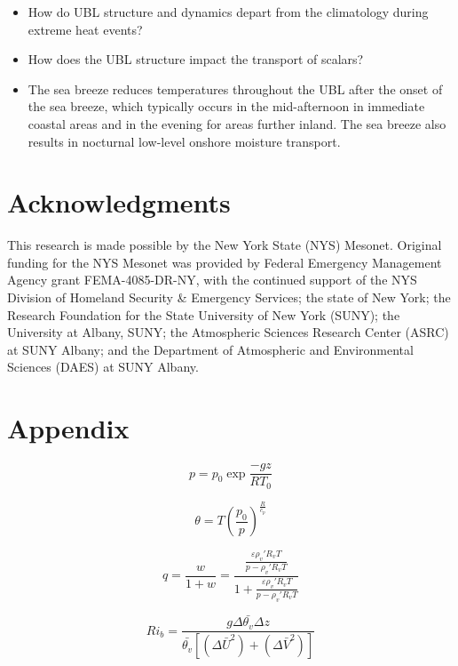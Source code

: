 \documentclass[11pt,a4paper]{article}
\begin{document}
\begin{itemize}
	\item How do UBL structure and dynamics depart from the climatology during extreme heat events?	
	\item How does the UBL structure impact the transport of scalars?
	\item The sea breeze reduces temperatures throughout the UBL after the onset of the sea breeze, which typically occurs in the mid-afternoon in immediate coastal areas and in the evening for areas further inland. The sea breeze also results in nocturnal low-level onshore moisture transport.
\end{itemize}

\section*{Acknowledgments}
This research is made possible by the New York State (NYS) Mesonet. Original funding for the NYS Mesonet was provided by Federal Emergency Management Agency grant FEMA-4085-DR-NY, with the continued support of the NYS Division of Homeland Security \& Emergency Services; the state of New York; the Research Foundation for the State University of New York (SUNY); the University at Albany, SUNY; the Atmospheric Sciences Research Center (ASRC) at SUNY Albany; and the Department of Atmospheric and Environmental Sciences (DAES) at SUNY Albany.

\printbibliography

\section*{Appendix}

\begin{equation*}\label{eqn:pressure}
	p = p_0 \exp{\frac{-g z}{R T_0}}
\end{equation*}

\begin{equation*}\label{eqn:potential_temperature}
	\theta = T \left(\frac{p_0}{p} \right)^{\frac{R}{c_p}}
\end{equation*}

\begin{equation*}\label{eqn:specific_humidity}
	q = \frac{w}{1+w} = \frac{\frac{\varepsilon \rho_v' R_v T}{p - \rho_v' R_v T}}{1+\frac{\varepsilon \rho_v' R_v T}{p - \rho_v' R_v T}} 
\end{equation*}

\begin{equation*}
	Ri_b = \frac{g \Delta \bar{\theta_v} \Delta z}{\bar{\theta_v} \left[ (\Delta \bar{U}^2) + (\Delta \bar{V}^2) \right] }
\end{equation*}
\end{document}
